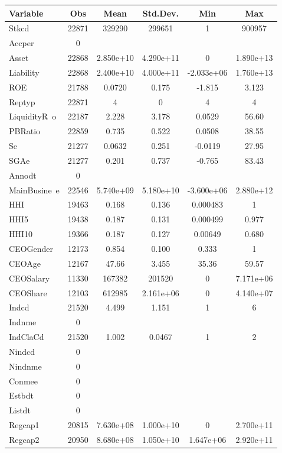 \documentclass[]{article}
\begin{document}
\begin{tabular}{lccccc} \hline
Variable & Obs & Mean & Std.Dev. & Min & Max \\ \hline
Stkcd & 22871 & 329290 & 299651 & 1 & 900957 \\
Accper & 0 &  &  &  &  \\
Asset & 22868 & 2.850e+10 & 4.290e+11 & 0 & 1.890e+13 \\
Liability & 22868 & 2.400e+10 & 4.000e+11 & -2.033e+06 & 1.760e+13 \\
ROE & 21788 & 0.0720 & 0.175 & -1.815 & 3.123 \\
Reptyp & 22871 & 4 & 0 & 4 & 4 \\
LiquidityR~o & 22187 & 2.228 & 3.178 & 0.0529 & 56.60 \\
PBRatio & 22859 & 0.735 & 0.522 & 0.0508 & 38.55 \\
Se & 21277 & 0.0632 & 0.251 & -0.0119 & 27.95 \\
SGAe & 21277 & 0.201 & 0.737 & -0.765 & 83.43 \\
Annodt & 0 &  &  &  &  \\
MainBusine~e & 22546 & 5.740e+09 & 5.180e+10 & -3.600e+06 & 2.880e+12 \\
HHI & 19463 & 0.168 & 0.136 & 0.000483 & 1 \\
HHI5 & 19438 & 0.187 & 0.131 & 0.000499 & 0.977 \\
HHI10 & 19366 & 0.187 & 0.127 & 0.00649 & 0.680 \\
CEOGender & 12173 & 0.854 & 0.100 & 0.333 & 1 \\
CEOAge & 12167 & 47.66 & 3.455 & 35.36 & 59.57 \\
CEOSalary & 11330 & 167382 & 201520 & 0 & 7.171e+06 \\
CEOShare & 12103 & 612985 & 2.161e+06 & 0 & 4.140e+07 \\
Indcd & 21520 & 4.499 & 1.151 & 1 & 6 \\
Indnme & 0 &  &  &  &  \\
IndClaCd & 21520 & 1.002 & 0.0467 & 1 & 2 \\
Nindcd & 0 &  &  &  &  \\
Nindnme & 0 &  &  &  &  \\
Conmee & 0 &  &  &  &  \\
Estbdt & 0 &  &  &  &  \\
Listdt & 0 &  &  &  &  \\
Regcap1 & 20815 & 7.630e+08 & 1.000e+10 & 0 & 2.700e+11 \\
Regcap2 & 20950 & 8.680e+08 & 1.050e+10 & 1.647e+06 & 2.920e+11 \\

\end{tabular}
\end{document}

